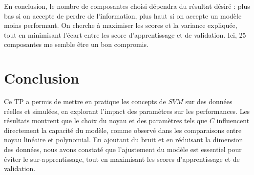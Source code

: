 \documentclass[11pt,a4paper]{article}
\begin{document}
En conclusion, le nombre de composantes choisi dépendra du résultat désiré : plus bas si on accepte de perdre de l'information, plus haut si on accepte un modèle moins performant. On cherche à maximiser les scores et la variance expliquée, tout en minimisant l'écart entre les score d'apprentissage et de validation. Ici, 25 composantes me semble être un bon compromis.

\section*{Conclusion}
Ce TP a permis de mettre en pratique les concepts de $SVM$ sur des données réelles et simulées, en explorant l’impact des paramètres sur les performances. Les résultats montrent que le choix du noyau et des paramètres tels que $C$ influencent directement la capacité du modèle, comme observé dans les comparaisons entre noyau linéaire et polynomial. En ajoutant du bruit et en réduisant la dimension des données, nous avons constaté que l’ajustement du modèle est essentiel pour éviter le sur-apprentissage, tout en maximisant les scores d’apprentissage et de validation.
\end{document}
